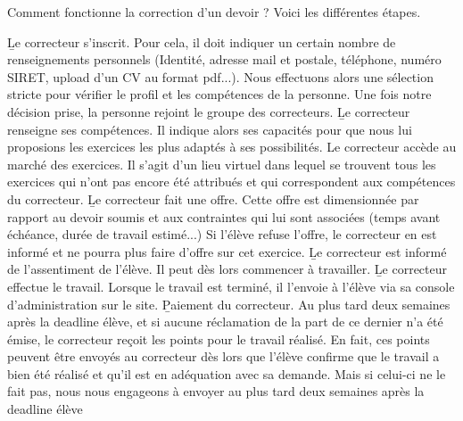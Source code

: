 ﻿Comment fonctionne la correction d'un devoir ? Voici les différentes étapes.

\begin{enumerate}
	\li \b{Le correcteur s'inscrit.} Pour cela, il doit indiquer un certain nombre de renseignements personnels  (Identité, adresse mail et postale, téléphone, numéro SIRET, upload d'un CV au format pdf...). Nous effectuons alors une sélection stricte pour vérifier le profil et les compétences de la personne. Une fois notre décision prise, la personne rejoint le groupe des correcteurs.
	\li\b{Le correcteur renseigne ses compétences.} Il indique alors ses capacités pour que nous lui proposions les exercices les plus adaptés à ses possibilités.
	\li \b{ Le correcteur accède au marché des exercices.} Il s'agit d'un lieu virtuel dans lequel se trouvent tous les exercices qui n'ont pas encore été attribués et qui correspondent aux compétences du correcteur.
	\li \b{Le correcteur fait une offre.}  Cette offre est dimensionnée par rapport au devoir soumis et aux contraintes qui lui sont associées (temps avant échéance, durée de travail estimé...) Si l'élève refuse l'offre, le correcteur en est informé et ne pourra plus faire d'offre sur cet exercice.
	\li \b{Le correcteur est informé de l'assentiment de l'élève.} Il peut dès lors commencer à travailler.
	\li \b{Le correcteur effectue le travail.} Lorsque le travail est terminé, il l'envoie à l'élève via sa console d'administration sur le site.
	\li \b{Paiement du correcteur.} Au plus tard deux semaines après la deadline élève, et si aucune réclamation de la part de ce dernier n'a été émise, le correcteur reçoit les points pour le travail réalisé. En fait, ces points peuvent être envoyés au correcteur dès lors que l'élève confirme que le travail a bien été réalisé et qu'il est en adéquation avec sa demande. Mais si celui-ci ne le fait pas, nous nous engageons à envoyer au plus tard deux semaines après la deadline élève
\end{enumerate}